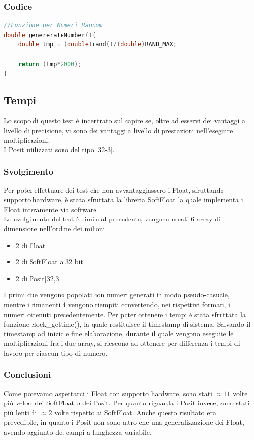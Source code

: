 \documentclass[a4paper,11pt]{article}
\begin{document}
\subsubsection{Codice}
\begin{lstlisting}[language=C++]
//Funzione per Numeri Random
double genererateNumber(){
	double tmp = (double)rand()/(double)RAND_MAX;
	
	return (tmp*2000);
}

\end{lstlisting}
\newpage
\subsection{Tempi}
Lo scopo di questo test è incentrato sul capire se, oltre ad esservi dei vantaggi a livello di precisione, vi sono dei vantaggi a livello di prestazioni nell'eseguire moltiplicazioni.\\
I Posit utilizzati sono del tipo [32-3]. 


\subsubsection{Svolgimento}
Per poter effettuare dei test che non avvantaggiassero i Float, sfruttando supporto hardware, è stata sfruttata la libreria SoftFloat\cite{softfloat} la quale implementa i Float interamente via software.\\
Lo svolgimento del test è simile al precedente, vengono creati 6 array di dimensione nell'ordine dei milioni \begin{itemize}
	\item 2 di Float
	\item 2 di SoftFloat a 32 bit
	\item 2 di Posit[32,3]
\end{itemize}
I primi due vengono popolati con numeri generati in modo pseudo-casuale, mentre i rimanenti 4 vengono riempiti convertendo, nei rispettivi formati, i numeri ottenuti precedentemente. Per poter ottenere i tempi è stata sfruttata la funzione clock\_gettime(), la quale restituisce il timestamp di sistema. Salvando il timestamp ad inizio e fine elaborazione, durante il quale vengono eseguite le moltiplicazioni fra i due array, si riescono ad ottenere per differenza i tempi di lavoro per ciascun tipo di numero.

\subsubsection{Conclusioni}
Come potevamo aspettarci i Float con supporto hardware, sono stati $\approx11$ volte più veloci dei SoftFloat o dei Posit. Per quanto riguarda i Posit invece, sono stati più lenti di $\approx2$ volte rispetto ai SoftFloat. Anche questo risultato era prevedibile, in quanto i Posit non sono altro che una generalizzazione dei Float, avendo aggiunto dei campi a lunghezza variabile. 
\end{document}
